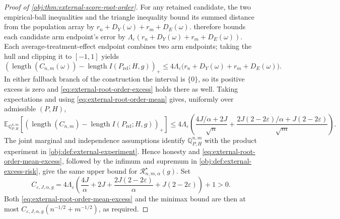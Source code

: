 \documentclass[11pt]{article}
\begin{document}
\begin{proof}[Proof of \cref{obj:thm:external-score-root-order}]
For any retained candidate, the two empirical-ball inequalities and the triangle inequality bound its summed distance from the population array by \(r_n+D_Y(\omega)+r_m+D_E(\omega)\).  therefore bounds each candidate arm endpoint's error by
\(\Lambda_\varepsilon(r_n+D_Y(\omega)+r_m+D_E(\omega))\). Each average-treatment-effect endpoint combines two arm endpoints; taking the hull and clipping it to \([-1,1]\) yields
\[
\left(\operatorname{length}(C_{n,m}(\omega))
-\operatorname{length}I(P_{\mathrm{rel}};H,g)\right)_+
\leq
4\Lambda_\varepsilon
 \bigl(r_n+D_Y(\omega)+r_m+D_E(\omega)\bigr). \label{eq:external-root-order-excess}
\]
In either fallback branch of the construction the interval is \(\{0\}\), so its positive excess is zero and \cref{eq:external-root-order-excess} holds there as well. Taking expectations and using \cref{eq:external-root-order-mean} gives, uniformly over admissible \((P,H)\),
\[
\mathbb E_{\mathbb Q_{P,H}^{n,m}}
 \left[\left(\operatorname{length}(C_{n,m})
-\operatorname{length}I(P_{\mathrm{rel}};H,g)\right)_+\right]
\leq
4\Lambda_\varepsilon
 \left(
 \frac{4J/\alpha+2J}{\sqrt n}
 +\frac{2J(2-2\varepsilon)/\alpha+J(2-2\varepsilon)}{\sqrt m}
 \right). \label{eq:external-root-order-mean-excess}
\]
The joint marginal and independence assumptions identify \(\mathbb Q_{P,H}^{n,m}\) with the product experiment in \cref{obj:def:external-experiment}. Hence honesty and \cref{eq:external-root-order-mean-excess}, followed by the infimum and supremum in \cref{obj:def:external-excess-risk}, give the same upper bound for \(\mathcal R^\star_{n,m,\alpha}(g)\). Set
\[
C_{\varepsilon,J,\alpha,g}
=
4\Lambda_\varepsilon
 \left(\frac{4J}{\alpha}+2J
       +\frac{2J(2-2\varepsilon)}{\alpha}
       +J(2-2\varepsilon)\right)+1>0.
\]
Both \cref{eq:external-root-order-mean-excess} and the minimax bound are then at most
\(C_{\varepsilon,J,\alpha,g}(n^{-1/2}+m^{-1/2})\), as required. %


\end{proof}
\end{document}
